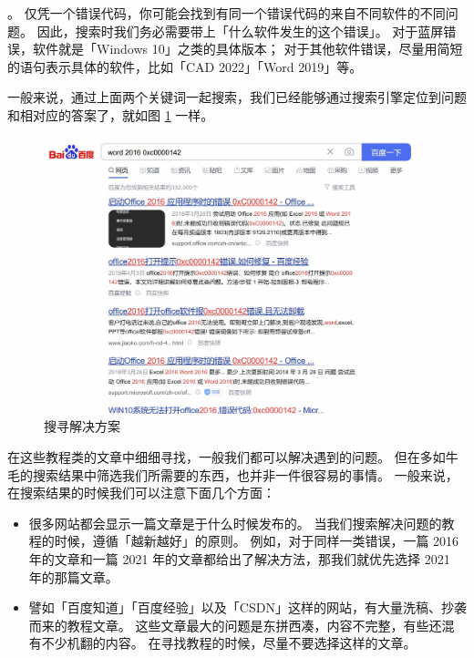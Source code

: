 。
仅凭一个错误代码，你可能会找到有同一个错误代码的来自不同软件的不同问题。
因此，搜索时我们务必需要带上「什么软件发生的这个错误」。
对于蓝屏错误，软件就是「Windows 10」之类的具体版本；
对于其他软件错误，尽量用简短的语句表示具体的软件，比如「CAD 2022」「Word 2019」等。

一般来说，通过上面两个关键词一起搜索，我们已经能够通过搜索引擎定位到问题和相对应的答案了，就如图 \ref{Find_Solutions} 一样。

\begin{figure}[htb!]
  \centering
  \includegraphics[width=11cm]{assets/Find_Solutions.jpg}
  \caption{搜寻解决方案}
  \label{Find_Solutions}
\end{figure}

在这些教程类的文章中细细寻找，一般我们都可以解决遇到的问题。
但在多如牛毛的搜索结果中筛选我们所需要的东西，也并非一件很容易的事情。
一般来说，在搜索结果的时候我们可以注意下面几个方面：

\begin{itemize}
  \item {}
    很多网站都会显示一篇文章是于什么时候发布的。
    当我们搜索解决问题的教程的时候，遵循「越新越好」的原则。
    例如，对于同样一类错误，一篇 2016 年的文章和一篇 2021 年的文章都给出了解决方法，那我们就优先选择 2021 年的那篇文章。
  \item {}
    譬如「百度知道」「百度经验」以及「CSDN」这样的网站，有大量洗稿、抄袭而来的教程文章。
    这些文章最大的问题是东拼西凑，内容不完整，有些还混有不少机翻的内容。
    在寻找教程的时候，尽量不要选择这样的文章。
\end{itemize}

\practice

